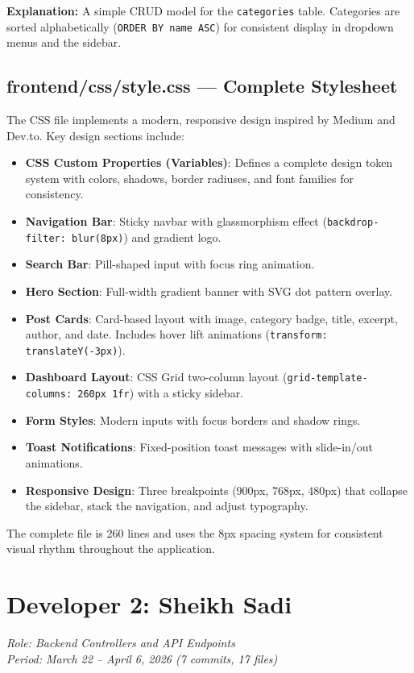 \documentclass[12pt,a4paper]{report}
\begin{document}
\textbf{Explanation:} A simple CRUD model for the \texttt{categories} table. Categories are sorted alphabetically (\texttt{ORDER BY name ASC}) for consistent display in dropdown menus and the sidebar.

\section{frontend/css/style.css --- Complete Stylesheet}
The CSS file implements a modern, responsive design inspired by Medium and Dev.to. Key design sections include:

\begin{itemize}
    \item \textbf{CSS Custom Properties (Variables)}: Defines a complete design token system with colors, shadows, border radiuses, and font families for consistency.
    \item \textbf{Navigation Bar}: Sticky navbar with glassmorphism effect (\texttt{backdrop-filter: blur(8px)}) and gradient logo.
    \item \textbf{Search Bar}: Pill-shaped input with focus ring animation.
    \item \textbf{Hero Section}: Full-width gradient banner with SVG dot pattern overlay.
    \item \textbf{Post Cards}: Card-based layout with image, category badge, title, excerpt, author, and date. Includes hover lift animations (\texttt{transform: translateY(-3px)}).
    \item \textbf{Dashboard Layout}: CSS Grid two-column layout (\texttt{grid-template-columns: 260px 1fr}) with a sticky sidebar.
    \item \textbf{Form Styles}: Modern inputs with focus borders and shadow rings.
    \item \textbf{Toast Notifications}: Fixed-position toast messages with slide-in/out animations.
    \item \textbf{Responsive Design}: Three breakpoints (900px, 768px, 480px) that collapse the sidebar, stack the navigation, and adjust typography.
\end{itemize}

The complete file is 260 lines and uses the 8px spacing system for consistent visual rhythm throughout the application.


\chapter{Developer 2: Sheikh Sadi}
\textit{Role: Backend Controllers and API Endpoints}\\
\textit{Period: March 22 -- April 6, 2026 (7 commits, 17 files)}
\end{document}
